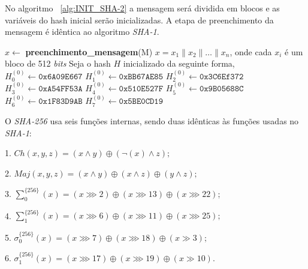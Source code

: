 \documentclass{SBCbookchapter}
\begin{document}
\begin{otherlanguage}{brazilian}
{\noindent No algoritmo ~\ref{alg:INIT_SHA-2} a mensagem será dividida em blocos e as variáveis do hash inicial serão inicializadas. 
A etapa de preenchimento da mensagem é idêntica ao algoritmo \textit{SHA-1}. 
	\begin{algorithm}
	\caption{Inicialização SHA-256}
	\begin{algorithmic}
	\State $x \leftarrow$ \textbf{preenchimento\_mensagem}(M)
	\State $x = x_1 \| x_2 \| \ldots \| x_n$, onde cada $x_i$ é um bloco de 512 \emph{bits}
	\State Seja o hash $H$ inicializado da seguinte forma,
	\State $H_0^{(0)} \leftarrow \texttt{0x6A09E667}$
	\State $H_1^{(0)} \leftarrow \texttt{0xBB67AE85}$
	\State $H_2^{(0)} \leftarrow \texttt{0x3C6Ef372}$
	\State $H_3^{(0)} \leftarrow \texttt{0xA54FF53A}$
	\State $H_4^{(0)} \leftarrow \texttt{0x510E527F}$
	\State $H_5^{(0)} \leftarrow \texttt{0x9B05688C}$
	\State $H_6^{(0)} \leftarrow \texttt{0x1F83D9AB}$
	\State $H_7^{(0)} \leftarrow \texttt{0x5BE0CD19}$
	\State {}
\end{algorithmic}
\label{alg:INIT_SHA-2}	
\end{algorithm} 

O \textit{SHA-256} usa seis funções internas, sendo duas idênticas às funções usadas no \textit{SHA-1}:

	1. $Ch(x,y,z) = (x \wedge y) \oplus (\neg(x) \wedge z);$

	2. $Maj(x,y,z) = (x \wedge y) \oplus (x \wedge z) \oplus (y \wedge z);$

	3. $\sum_0^{\{256\}}(x) = (x \ggg 2) \oplus (x \ggg 13) \oplus (x \ggg 22);$

	4. $\sum_1^{\{256\}}(x) = (x \ggg 6) \oplus (x \ggg 11) \oplus (x \ggg 25);$

	5. $\sigma_0^{\{256\}}(x) = (x \ggg 7) \oplus (x \ggg 18) \oplus (x \gg 3);$

	6. $\sigma_1^{\{256\}}(x) = (x \ggg 17) \oplus (x \ggg 19) \oplus (x \gg 10).$

}
\end{otherlanguage}
\end{document}
